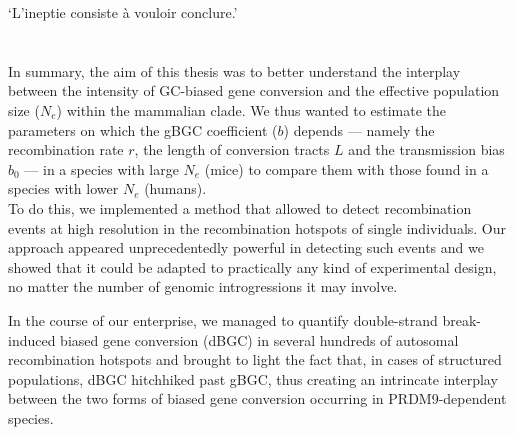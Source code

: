 \begin{savequote}[8cm]

	‘L'ineptie consiste à vouloir conclure.’

\end{savequote}

\chapter*{\label{ch:conclusion}}


In summary, the aim of this thesis was to better understand the interplay between the intensity of GC-biased gene conversion and the effective population size ($N_e$) within the mammalian clade.
We thus wanted to estimate the parameters on which the gBGC coefficient ($b$) depends — namely the recombination rate $r$, the length of conversion tracts $L$ and the transmission bias $b_0$ — in a species with large $N_e$ (mice) to compare them with those found in a species with lower $N_e$ (humans).\\

To do this, we implemented a method that allowed to detect recombination events at high resolution in the recombination hotspots of single individuals.
Our approach appeared unprecedentedly powerful in detecting such events and we showed that it could be adapted to practically any kind of experimental design, no matter the number of genomic introgressions it may involve.

In the course of our enterprise, we managed to quantify double-strand break-induced biased gene conversion (dBGC) in several hundreds of autosomal recombination hotspots and brought to light the fact that, in cases of structured populations, dBGC hitchhiked past gBGC, thus creating an intrincate interplay between the two forms of biased gene conversion occurring in PRDM9-dependent species.\\

